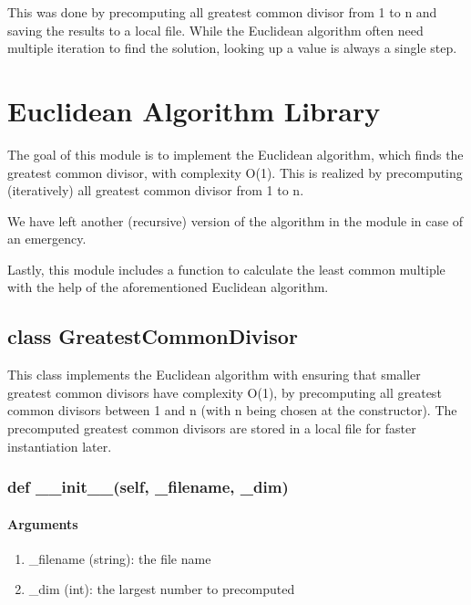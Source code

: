 \documentclass[refman]{scrartcl}
\begin{document}
This was done by precomputing all greatest common divisor from 1 to n and saving the results to a local file. While the Euclidean algorithm often need multiple iteration to find the solution, looking up a value is always a single step.

\section{Euclidean Algorithm Library}

The goal of this module is to implement the Euclidean algorithm, which finds the greatest common divisor, with complexity O(1). This is realized by precomputing (iteratively) all greatest common divisor from 1 to n.

We have left another (recursive) version of the algorithm in the module in case of an emergency.

Lastly, this module includes a function to calculate the least common multiple with the help of the aforementioned Euclidean algorithm.

\subsection{class GreatestCommonDivisor}

This class implements the Euclidean algorithm with ensuring that smaller greatest common divisors have complexity O(1), by precomputing all greatest common divisors between 1 and n (with n being chosen at the constructor). The precomputed greatest common divisors are stored in a local file for faster instantiation later.

\subsubsection{def \_\_init\_\_(self, \_filename, \_dim)}

\paragraph*{Arguments}

\begin{enumerate}
	\item \_filename (string): the file name
	\item \_dim (int): the largest number to precomputed
\end{enumerate}
\end{document}
